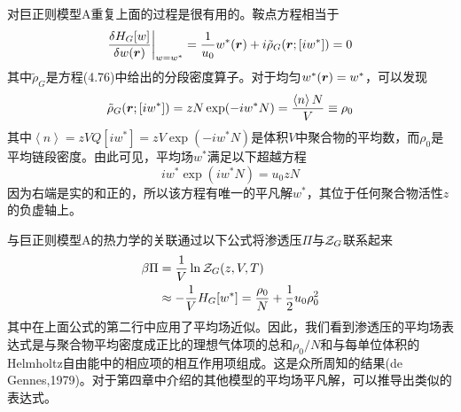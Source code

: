 对巨正则模型A重复上面的过程是很有用的。鞍点方程相当于
\begin{equation}
\frac{\delta H_G[w]}{\delta w(\bm{r})}\bigg|_{w=w^*}=\frac{1}{u_0}w^*(\bm{r})+i\tilde{\rho}_G(\bm{r};[iw^*])=0
\end{equation}
其中$\tilde{\rho}_G$是方程(4.76)中给出的分段密度算子。对于均匀$w^*(\bm{r})=w^*$，可以发现
\begin{equation}
\tilde{\rho}_G(\bm{r};[iw^*])=zN\exp(-iw^*N)=\frac{\left\langle n\right\rangle N}{V}\equiv\rho_0
\end{equation}
其中$\left\langle n\right\rangle=zVQ[iw^*]=zV\exp(-iw^*N)$是体积$V$中聚合物的平均数，而$\rho_0$是平均链段密度。由此可见，平均场$w^*$满足以下超越方程
\begin{equation}
iw^*\exp(iw^*N)=u_0zN
\end{equation}
因为右端是实的和正的，所以该方程有唯一的平凡解$w^*$，其位于任何聚合物活性$z$的负虚轴上。

与巨正则模型A的热力学的关联通过以下公式将渗透压$\Pi$与$\mathcal{Z}_G$联系起来
\begin{equation}
\begin{aligned}
\beta\Pi&=\frac{1}{V}\ln\mathcal{Z}_G(z,V,T)\\
&\approx-\frac{1}{V}H_G[w^*]=\frac{\rho_0}{N}+\frac{1}{2}u_0\rho_0^2
\end{aligned}
\end{equation}
其中在上面公式的第二行中应用了平均场近似。因此，我们看到渗透压的平均场表达式是与聚合物平均密度成正比的理想气体项的总和$\rho_0/N$和与每单位体积的Helmholtz自由能中的相应项的相互作用项组成。这是众所周知的结果(de Gennes,1979)。对于第四章中介绍的其他模型的平均场平凡解，可以推导出类似的表达式。

